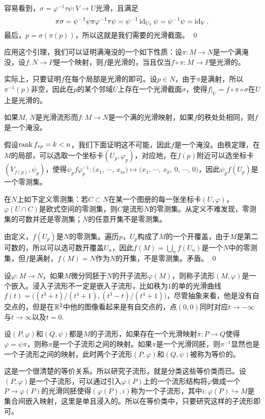 	容易看到，$\sigma = \varphi^{-1} \tau \psi : V\to U$光滑，且满足
	\[
	\pi \sigma = \psi^{-1} \psi \pi \varphi^{-1} \tau \psi= \psi^{-1}\operatorname{id}_{U_1} \psi = \psi^{-1}\psi=\operatorname{id}_{V}.
	\]
	最后，$p=\sigma(\pi(p))$，所以这就是我们需要的光滑截面。
\qed

应用这个引理，我们可以证明满淹没的一个如下性质：设$\pi :M\to N$是一个满淹没，设$f:N\to P$是一个映射，则$f$是光滑的，当且仅当$f\circ \pi:M\to P$是光滑的。

实际上，只要证明$f$在每个局部是光滑的即可。设$p\in N$，由于$\pi$是满射，所以$\pi^{-1}(p)$非空，因此在$p$的某个邻域$U$上存在一个光滑截面$\sigma$，使得$f|_U=f\circ \pi\circ \sigma$在$U$上是光滑的。

\pro \label{pro:surrank}如果$M$, $N$是光滑流形而$f:M\to N$是一个满的光滑映射，如果$f$的秩处处相同，则$f$是一个淹没。

\proof
	假设$\operatorname{rank} f_{*p}=k< n$，我们下面证明这不可能，因此$f$是一个淹没。由秩定理，在$M$的局部，可以选取一个坐标卡$(U_p,\varphi_p)$，对应地，在$f(p)$附近可以选坐标卡$(V_{f(p)},\psi_p)$，使得$\psi_p f\varphi^{-1}_p:(x_1$, $\cdots$, $x_m)\mapsto (x_1$, $\cdots$, $x_k$, $0$, $\cdots$, $0)$，因此$\psi_p f(U_p)$是一个零测集。

	在$N$上如下定义零测集：若$C\subset N$在某一个图册的每一张坐标卡$(U,\varphi)$，$\varphi(U\cap C)$是欧式空间的零测集，则$C$是流形$N$的零测集。从定义不难发现，零测集的可数并还是零测集；$N$的任意开集不是零测集。

	由定义，$f(U_p)$是$N$的零测集。遍历$p$，$U_p$构成了$M$的一个开覆盖，由于$M$是第二可数的，所以可以选可数开覆盖$U_n$，因此$f(M)=\bigcup_n f(U_n)$是一个$N$中的零测集，但$f$是满射，$f(M)=N$作为$N$的开集，不是零测集。矛盾。
\qed

\para 设$\varphi:M\to N$，如果$M$微分同胚于$N$的开子流形$\varphi(M)$，则称子流形$(M,\varphi)$是一个嵌入。浸入子流形不一定是嵌入子流形，比如秩为$1$的单的光滑曲线$f(t)=\bigl((t^3+t)/(t^4+1),(t^3-t)/(t^4+1)\bigr)$，尽管抽象来看，他是没有自交点的，但是在$\mathbb{R}^2$中他的图像看起来是有自交点的，点$(0,0)$同时对应$t\to -\infty$与$t\to \infty$以及$t=0$. 

\para 设$(P,\varphi)$和$(Q,\psi)$都是$M$的子流形，如果存在一个光滑映射$\pi:P\to Q$使得$\varphi=\psi\pi$，则称$\pi$是一个子流形之间的映射。如果$\pi$是一个光滑同胚，则$\pi^{-1}$显然也是一个子流形之间的映射，此时两个子流形$(P,\varphi)$和$(Q,\psi)$被称为等价的。

这是一个很清楚的等价关系。所以研究子流形，就是分类这些等价类而已。设$(P,\varphi)$是一个子流形，可以通过引入$\varphi(P)$上的一个流形结构将$\varphi$做成一个$P\to \varphi(P)$的光滑同胚使得$(\varphi(P),i)$称为一个子流形，其中$i:\varphi(P)\hookrightarrow M$是集合间嵌入映射，这里是单且浸入的。所以在等价类中，只要研究这样的子流形即可。

